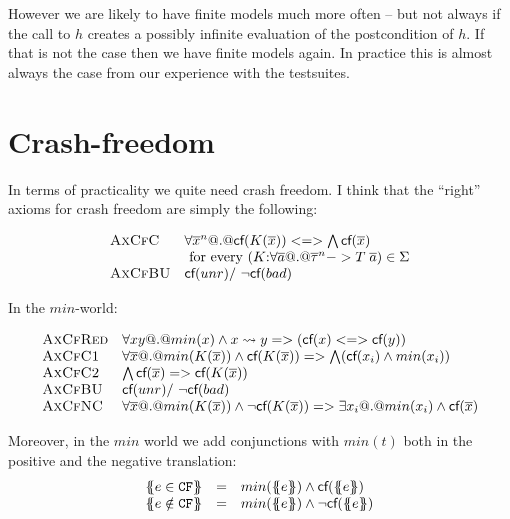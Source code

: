 \documentclass[preprint]{sigplanconf}
\begin{document}
However we are likely to have finite models much more often -- but not always if the call 
to $h$ creates a possibly infinite evaluation of the postcondition of $h$. If that is not 
the case then we have finite models again. In practice this is almost always the case from 
our experience with the testsuites.


\section{Crash-freedom}

In terms of practicality we quite need crash freedom. I think that the ``right'' 
axioms for crash freedom are simply the following:

\[\begin{array}{ll}
 \textsc{AxCfC}  & {\forall \overline{x}^{n} @.@ \textsf{cf}(K(\overline{x})) <=> \bigwedge\textsf{cf}(\overline{x})} \\
                 & \mbox{ for every } (K{:}\forall\overline{a} @.@ \overline{\tau}^{n} -> T\;\overline{a}) \in \Sigma \\
 \textsc{AxCfBU} & {\textsf{cf}(\mathop{unr}) /\ \neg\textsf{cf}(\mathop{bad})}
\end{array}\]

In the $min$-world:

\[\begin{array}{ll}
 \textsc{AxCfRed}  & \forall x y @.@ min(x) \land x \rightsquigarrow y => (\textsf{cf}(x) <=> \textsf{cf}(y)) \\
 \textsc{AxCfC1}   & \forall \overline{x} @.@ min(K(\overline{x})) \land \textsf{cf}(K(\overline{x})) => \bigwedge(\textsf{cf}(x_i) \land min(x_i))\\
 \textsc{AxCfC2}  & \bigwedge\textsf{cf}(\overline{x}) => \textsf{cf}(K(\overline{x})) \\ 
 \textsc{AxCfBU} & {\textsf{cf}(\mathop{unr}) /\ \neg\textsf{cf}(\mathop{bad})} \\
 \textsc{AxCfNC}   & \forall \overline{x} @.@ min(K(\overline{x})) \land \neg\textsf{cf}(K(\overline{x})) => 
                                              \exists x_i @.@ min(x_i) \land \textsf{cf}(\overline{x}) \\
\end{array}\]

Moreover, in the $min$ world we add conjunctions with $min(t)$ 
both in the positive and the negative translation:
\[\begin{array}{lcl}
    \ctrans{}{}{e \in \CF}    & = & min(\etrans{}{}{e}) \land \lcf{\etrans{}{}{e}} \\ 
    \ctrans{}{}{e \notin \CF} & = & min(\etrans{}{}{e}) \land \lncf{\etrans{}{}{e}}
\end{array}\]
\end{document}
